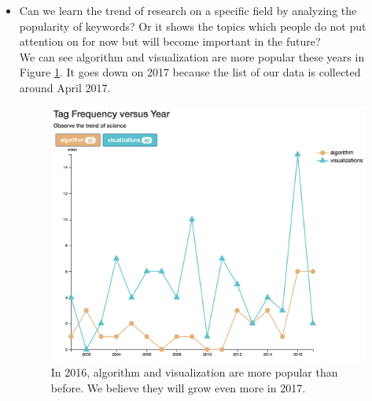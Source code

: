 \documentclass{report}
\numberwithin{figure}{section}
\begin{document}
\begin{itemize}
\item
Can we learn the trend of research on a specific field by analyzing the popularity of keywords? Or it shows the topics which people do not put attention on for now but will become important in the future?
\\
\quad We can see algorithm and visualization are more popular these years in Figure \ref{fig:vis}. It goes down on 2017 because the list of our data is collected around April 2017.

\begin{figure}
\begin{center}
\includegraphics[scale=0.5]{vis}
\caption{In 2016, algorithm and visualization are more popular than before. We believe they will grow even more in 2017.}
\label{fig:vis}
\end{center}
\end{figure} 

\end{itemize}
 


\end{document}
